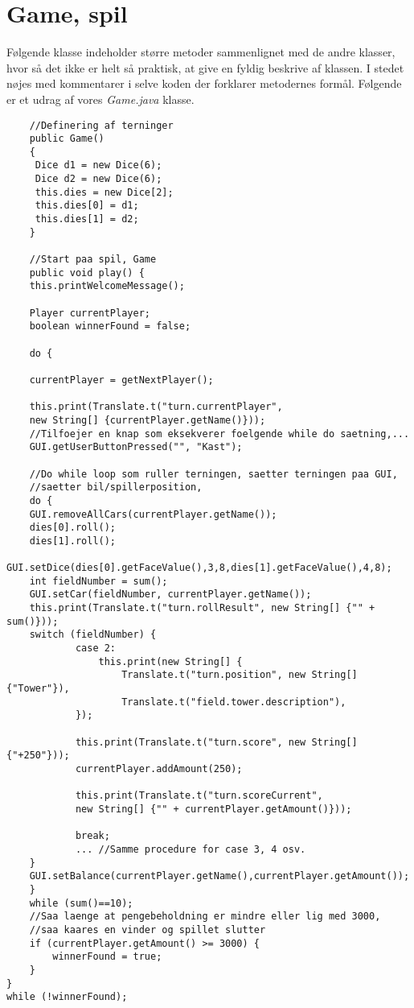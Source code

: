 \section{Game, spil}
\noindent Følgende klasse indeholder større metoder sammenlignet med de andre klasser, hvor så det ikke er helt så praktisk, at give en fyldig beskrive af klassen.
I stedet nøjes med kommentarer i selve koden der forklarer metodernes formål.
Følgende er et udrag af vores \textit{Game.java} klasse.\\
\begin{lstlisting}
    //Definering af terninger
    public Game()
    {
     Dice d1 = new Dice(6);
     Dice d2 = new Dice(6);
     this.dies = new Dice[2];
     this.dies[0] = d1;
     this.dies[1] = d2;
    }

    //Start paa spil, Game
    public void play() {
    this.printWelcomeMessage();

    Player currentPlayer;
    boolean winnerFound = false;

    do {

    currentPlayer = getNextPlayer();

    this.print(Translate.t("turn.currentPlayer",
    new String[] {currentPlayer.getName()}));
    //Tilfoejer en knap som eksekverer foelgende while do saetning,...
    GUI.getUserButtonPressed("", "Kast");
    
    //Do while loop som ruller terningen, saetter terningen paa GUI,
    //saetter bil/spillerposition, 
    do {
    GUI.removeAllCars(currentPlayer.getName());
    dies[0].roll();
    dies[1].roll();
    GUI.setDice(dies[0].getFaceValue(),3,8,dies[1].getFaceValue(),4,8);
    int fieldNumber = sum();
    GUI.setCar(fieldNumber, currentPlayer.getName());
    this.print(Translate.t("turn.rollResult", new String[] {"" + sum()}));
    switch (fieldNumber) {
            case 2:
                this.print(new String[] {
                    Translate.t("turn.position", new String[] {"Tower"}),
                    Translate.t("field.tower.description"),
            });
            
            this.print(Translate.t("turn.score", new String[] {"+250"}));
            currentPlayer.addAmount(250);
            
            this.print(Translate.t("turn.scoreCurrent",
            new String[] {"" + currentPlayer.getAmount()}));

            break;
            ... //Samme procedure for case 3, 4 osv.
    }
    GUI.setBalance(currentPlayer.getName(),currentPlayer.getAmount());
    }
    while (sum()==10);
    //Saa laenge at pengebeholdning er mindre eller lig med 3000,
    //saa kaares en vinder og spillet slutter
    if (currentPlayer.getAmount() >= 3000) {
        winnerFound = true;
    }
}
while (!winnerFound);


\end{lstlisting}
